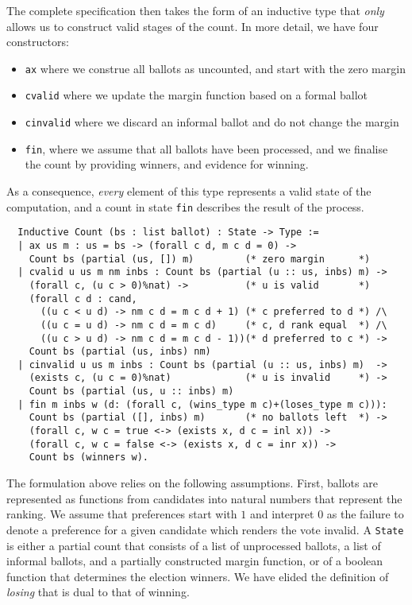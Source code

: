 \documentclass{llncs}
\begin{document}
\noindent
The complete specification then takes the form of an inductive type
that \emph{only} allows us to construct valid stages of the count.
In more detail, we have four constructors:
\begin{itemize}
  \item \texttt{ax} where we construe all ballots as uncounted, and
start with the zero margin 
  \item \texttt{cvalid} where we update the margin function based on
a formal ballot
  \item \texttt{cinvalid} where we discard an informal ballot and do
not change the margin 
  \item \texttt{fin}, where we assume that all ballots have been
processed, and we finalise the count by providing winners, and
evidence for winning.
\end{itemize}


\noindent
As a consequence, \emph{every} element of this type represents a
valid state of the computation, and a count in state \texttt{fin}
describes the result of the process.

\begin{verbatim}
  Inductive Count (bs : list ballot) : State -> Type :=
  | ax us m : us = bs -> (forall c d, m c d = 0) -> 
    Count bs (partial (us, []) m)         (* zero margin      *)
  | cvalid u us m nm inbs : Count bs (partial (u :: us, inbs) m) -> 
    (forall c, (u c > 0)%nat) ->          (* u is valid       *)
    (forall c d : cand, 
      ((u c < u d) -> nm c d = m c d + 1) (* c preferred to d *) /\
      ((u c = u d) -> nm c d = m c d)     (* c, d rank equal  *) /\
      ((u c > u d) -> nm c d = m c d - 1))(* d preferred to c *) ->
    Count bs (partial (us, inbs) nm)
  | cinvalid u us m inbs : Count bs (partial (u :: us, inbs) m)  -> 
    (exists c, (u c = 0)%nat)             (* u is invalid     *) ->
    Count bs (partial (us, u :: inbs) m)
  | fin m inbs w (d: (forall c, (wins_type m c)+(loses_type m c))):
    Count bs (partial ([], inbs) m)       (* no ballots left  *) ->
    (forall c, w c = true <-> (exists x, d c = inl x)) ->
    (forall c, w c = false <-> (exists x, d c = inr x)) ->
    Count bs (winners w).
\end{verbatim}

\noindent
The formulation above relies on the following assumptions. First,
ballots are represented as functions from candidates into natural
numbers that represent the ranking. We assume that preferences start
with $1$ and interpret $0$ as the failure to denote a preference for
a given candidate which renders the vote invalid. A \texttt{State}
is either  a partial count that consists of a list of unprocessed
ballots, a list of informal ballots, and a partially constructed
margin function, or of a boolean function that determines the
election winners. We have elided the definition of \emph{losing}
that is dual to that of winning. 
\end{document}
